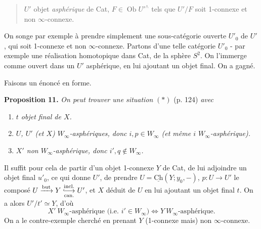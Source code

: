 \begin{quote}
$U'$ objet \textit{asphérique} de Cat, $F\in\operatorname{Ob}U'^\wedge$ tels que $U'/F$ soit 1-connexe et non $\infty$-connexe.
\end{quote}

On songe par exemple à prendre simplement une sous-catégorie ouverte $U'_0$ de $U'$, qui soit 1-connexe et non $\infty$-connexe. Partons d'une telle catégorie $U'_0$ - par exemple une réalisation homotopique dans Cat, de la sphère $S^2$. On l'immerge comme ouvert dans un $U'$ asphérique, en lui ajoutant un objet final. On a gagné.


Faisons un énoncé en forme.

\textbf{Proposition 11.} \textit{On peut trouver une situation} $(*)$ (p. 124) \textit{avec}

\begin{enumerate}[label=\textit{\alph*)}]
\item \textit{$t$ objet final de $X$.}
\item \textit{$U$, $U'$ (et $X$) $W_\infty$-asphériques, donc $i,p\in W_\infty$ (et même $i$ $W_\infty$-asphérique).}
\item \textit{$X'$ non $W_\infty$-asphérique, donc $i',q\notin W_\infty$.}
\end{enumerate}

Il suffit pour cela de partir d'un objet 1-connexe $Y$ de Cat, de lui adjoindre un objet final $u'_0$, ce qui donne $U'$, de prendre $U=\underline{\mathrm{Ch}}(Y;y_0,-)$, $p:U\longrightarrow U'$ le composé $U\xrightarrow{\text{but}}Y\underset{\text{can.}}{\overset{\text{incl.}}{\hra}}U'$, et $X$ déduit de $U$ en lui ajoutant un objet final $t$. On a alors $U'/t'\simeq Y$, d'où
\[ X'\ W_\infty\text{-asphérique (i.e. }i'\in W_\infty)\Longleftrightarrow Y\ W_\infty\text{-asphérique.} \]
On a le contre-exemple cherché en prenant $Y$ (1-connexe mais) non $\infty$-connexe.

